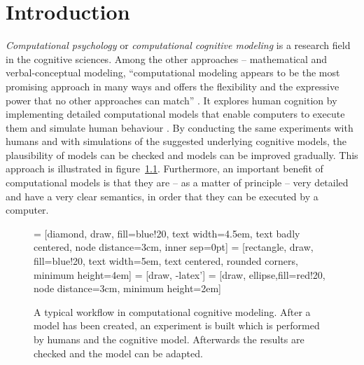 \chapter{Introduction}

\emph{Computational psychology} or \emph{computational cognitive modeling} is a research field in the cognitive sciences. Among the other approaches -- mathematical and verbal-conceptual modeling, ``computational modeling appears to be the most promising approach in many ways and offers the flexibility and the expressive power that no other approaches can match'' \cite[vii]{sun_introduction_2008}. It explores human cognition by implementing detailed computational models that enable computers to execute them and simulate human behaviour \cite[3]{sun_introduction_2008}. By conducting the same experiments with humans and with simulations of the suggested underlying cognitive models, the plausibility of models can be checked and models can be improved gradually. This approach is illustrated in figure~\ref{fig:cognitive_modeling_exp}. Furthermore, an important benefit of computational models is that they are -- as a matter of principle -- very detailed and have a very clear semantics, in order that they can be executed by a computer. 

\begin{figure}[hbt]
\centering
 = [diamond, draw, fill=blue!20, 
    text width=4.5em, text badly centered, node distance=3cm, inner sep=0pt]
 = [rectangle, draw, fill=blue!20, 
    text width=5em, text centered, rounded corners, minimum height=4em]
 = [draw, -latex']
 = [draw, ellipse,fill=red!20, node distance=3cm,
    minimum height=2em]
    
\caption{A typical workflow in computational cognitive modeling. After a model has been created, an experiment is built which is performed by humans and the cognitive model. Afterwards the results are checked and the model can be adapted. \cite{about_actr_homepage}}
\label{fig:cognitive_modeling_exp}
\end{figure}


